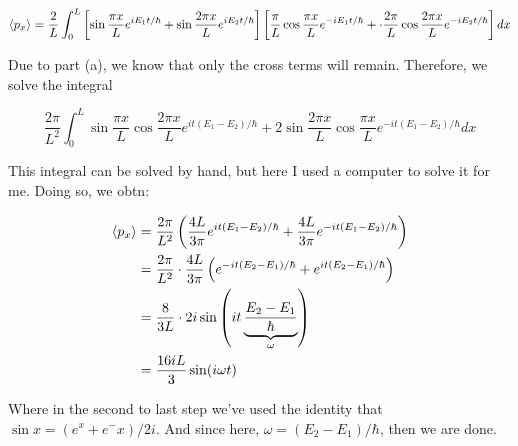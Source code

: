 \documentclass[10pt]{article}
\begin{document}
\begin{enumerate}[(a)]
\begin{solution}
            \[ \langle p_x \rangle = \frac{2}{L} \int_0^L\left[ \sin \frac{\pi x}{L} e^{iE_1t/\hbar} + \sin \frac{2\pi x}{L} e^{iE_2t/\hbar}\right]\left[ \frac \pi L \cos \frac{\pi x}{L} e^{-iE_1t/\hbar} + \cdot \frac{2\pi}{L} \cos \frac{2\pi x}{L} e^{-iE_2t/\hbar}\right] dx \] 

            Due to part (a), we know that only the cross terms will remain. Therefore, we solve the integral

            \[ \frac{2\pi}{L^2} \int_0^L \sin \frac{\pi x}{L} \cos \frac{2\pi x}{L} e^{it(E_1 - E_2)/\hbar} + 2\sin \frac{2\pi x}{L} \cos \frac{\pi x}{L} e^{-it(E_1 - E_2)/\hbar} dx \] 

            This integral can be solved by hand, but here I used a computer to solve it for me. Doing so, we obtn: 

            \begin{align*}
                \langle p_x \rangle &= \frac{2\pi}{L^2} \left( \frac{4L}{3\pi} e^{it(E_1 - E_2)/\hbar} + \frac{4L}{3\pi}e^{-it(E_1 - E_2)/\hbar}\right)\\
                &= \frac{2\pi}{L^2} \cdot \frac{4L}{3\pi} \left(e^{-it(E_2 - E_1)/\hbar} + e^{it(E_2 - E_1)/\hbar}\right)\\
                &= \frac{8}{3L} \cdot 2i \sin \left( it \underbrace{\frac{E_2 - E_1}{\hbar}}_{\omega}\right)\\
                &= \frac{16iL}{3} \sin(i\omega t)
            \end{align*}

            Where in the second to last step we've used the identity that $\sin x = (e^x + e^-x)/2i$. And since here, $\omega = (E_2 - E_1)/\hbar$, then we are done. 
        \end{solution}
    \end{enumerate}
\end{document}
